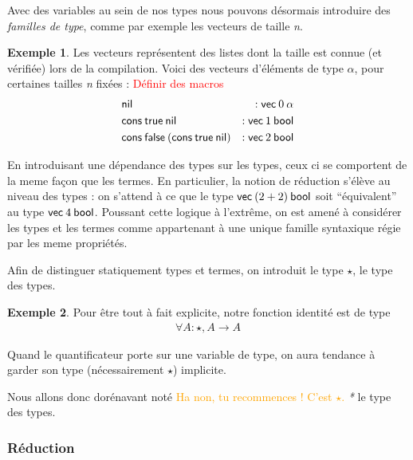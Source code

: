 \documentclass {article}
\theoremstyle{definition}
\newtheorem{example}{Exemple}
\theoremstyle{remark}
\newcommand{\todo}[1]{\textcolor{red}{#1}}
\newcommand{\attention}[1]{\textcolor{orange}{#1}}
\begin{document}
\newcommand{\nil}{\ensuremath{\mathsf{nil}}}
\newcommand{\cons}{\ensuremath{\mathsf{cons}}}
\newcommand{\Vect}{\ensuremath{\mathsf{vec}}}

Avec des variables au sein de nos types nous pouvons désormais introduire des \emph{familles de type},
comme par exemple les vecteurs de taille \emph{n}.
\begin{example}  
  \label{example vecteur}
  Les vecteurs représentent des listes dont la taille est connue (et
  vérifiée) lors de la compilation. Voici des vecteurs d'éléments de
  type $\alpha$, pour certaines tailles \emph{n} fixées : \todo{Définir des macros}
  \begin{align*}
    &\nil &: \Vect\: 0\: \alpha \\
    &\cons\: \true\: \nil &: \Vect\: 1\: \bool \\
    &\cons\: \false\: (\cons\: \true\: \nil) &: \Vect\: 2\: \bool \\
  \end{align*}
\end{example}
En introduisant une dépendance des types sur les types, ceux ci se
comportent de la meme façon que les termes. En particulier, la notion
de réduction s'élève au niveau des types : on s'attend à ce que le
type \(\Vect\: (2 + 2)\: \bool\) soit ``équivalent'' au type \(\Vect\:
4\: \bool\).  Poussant cette logique à l'extrême, on est amené à
considérer les types et les termes comme appartenant à une unique
famille syntaxique régie par les meme propriétés.

Afin de distinguer statiquement types et termes, on introduit le type
$\star$, le type des types.
\begin{example}
  Pour être tout à fait explicite, notre fonction identité est de type
  \begin{align*}
    \forall A : \star, A \rightarrow A
  \end{align*}
  
  Quand le quantificateur porte sur une variable de type, on aura
  tendance à garder son type (nécessairement $\star$) implicite.

\end{example}
Nous allons donc dorénavant noté \attention{Ha non, tu recommences ! C'est $\star$.} \emph{*} le type des types.




\subsubsection{Réduction}
\label{maj_eval}
\end{document}
